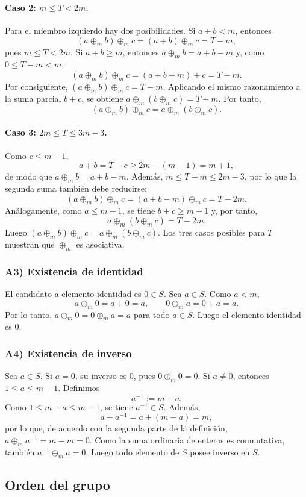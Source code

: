 \documentclass[11pt,a4paper]{article}
\newcommand{\opm}{\mathbin{\oplus_m}}
\begin{document}
\paragraph{Caso 2: $m\leq T<2m$.}
Para el miembro izquierdo hay dos posibilidades. Si $a+b<m$, entonces
\[
(a\opm b)\opm c=(a+b)\opm c=T-m,
\]
pues $m\leq T<2m$. Si $a+b\geq m$, entonces $a\opm b=a+b-m$ y, como $0\leq T-m<m$,
\[
(a\opm b)\opm c=(a+b-m)+c=T-m.
\]
Por consiguiente, $(a\opm b)\opm c=T-m$. Aplicando el mismo razonamiento a la suma parcial $b+c$, se obtiene $a\opm(b\opm c)=T-m$. Por tanto,
\[
(a\opm b)\opm c=a\opm(b\opm c).
\]

\paragraph{Caso 3: $2m\leq T\leq 3m-3$.}
Como $c\leq m-1$,
\[
a+b=T-c\geq 2m-(m-1)=m+1,
\]
de modo que $a\opm b=a+b-m$. Además, $m\leq T-m\leq 2m-3$, por lo que la segunda suma también debe reducirse:
\[
(a\opm b)\opm c=(a+b-m)\opm c=T-2m.
\]
Análogamente, como $a\leq m-1$, se tiene $b+c\geq m+1$ y, por tanto,
\[
a\opm(b\opm c)=T-2m.
\]
Luego $(a\opm b)\opm c=a\opm(b\opm c)$. Los tres casos posibles para $T$ muestran que $\oplus_m$ es asociativa.

\subsubsection*{A3) Existencia de identidad}

El candidato a elemento identidad es $0\in S$. Sea $a\in S$. Como $a<m$,
\[
a\opm 0=a+0=a,\qquad 0\opm a=0+a=a.
\]
Por lo tanto, $a\opm 0=0\opm a=a$ para todo $a\in S$. Luego el elemento identidad es $0$.

\subsubsection*{A4) Existencia de inverso}

Sea $a\in S$. Si $a=0$, su inverso es $0$, pues $0\opm 0=0$. Si $a\neq 0$, entonces $1\leq a\leq m-1$. Definimos
\[
a^{-1}:=m-a.
\]
Como $1\leq m-a\leq m-1$, se tiene $a^{-1}\in S$. Además,
\[
a+a^{-1}=a+(m-a)=m,
\]
por lo que, de acuerdo con la segunda parte de la definición, $a\opm a^{-1}=m-m=0$. Como la suma ordinaria de enteros es conmutativa, también $a^{-1}\opm a=0$. Luego todo elemento de $S$ posee inverso en $S$.

\subsection*{Orden del grupo}
\end{document}
